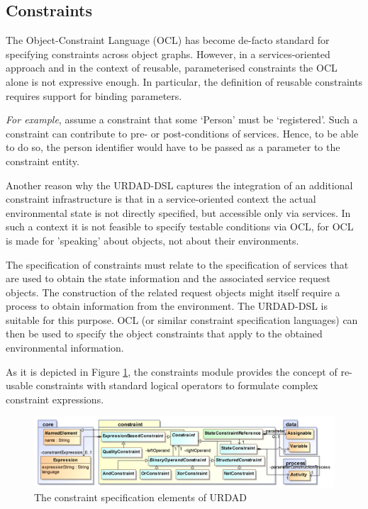 \subsection{Constraints}


The Object-Constraint Language (OCL) has become de-facto standard for specifying constraints across object graphs. However, in a services-oriented approach and in the context of reusable, parameterised constraints the OCL alone is not expressive enough. In particular, the definition of reusable constraints requires support for binding parameters. 

\emph{For example}, assume a constraint that some `Person' must be `registered'. Such a constraint can contribute to pre- or post-conditions of services. Hence, to be able to do so, the person identifier would have to be passed as a parameter to the constraint entity.

Another reason why the URDAD-DSL captures the integration of an additional constraint infrastructure is that in a service-oriented context the actual environmental state is not directly specified, but accessible only via services. In such a context it is not feasible to specify testable conditions via OCL, for OCL is made for 'speaking' about objects, not about their environments.

The specification of constraints must relate to the specification of services that are used to obtain the state information and the associated service request objects. The construction of the related request objects might itself require a process to obtain information from the environment. The URDAD-DSL is suitable for this purpose. OCL (or similar constraint specification languages) can then be used to specify the object constraints that apply to the obtained environmental information.

As it is depicted in Figure \ref{fig:constraintModule}, the constraints module provides the concept of re-usable constraints with standard logical operators to formulate complex constraint expressions.
\begin{figure}[Htbp]
  \centering
  \includegraphics{constraint}
  \caption{The constraint specification elements of URDAD}
  \label{fig:constraintModule}
\end{figure}

